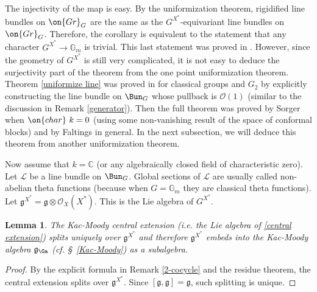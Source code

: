 \documentclass[]{pcmi}
\theoremstyle{plain}
\newtheorem{lem}[equation]{Lemma}
\theoremstyle{remark}
\theoremstyle{definition}
\newcommand{\frakg}{{\mathfrak g}}
\newcommand{\bC}{{\mathbb C}}
\newcommand{\bG}{{\mathbb G}}
\newcommand{\mL}{{\mathcal L}}
\newcommand{\mO}{{\mathcal O}}
\newcommand{\cha}{{\on{char}}}
\newcommand{\Gr}{{\on{Gr}}}
\begin{document}
The injectivity of the map is easy. By the uniformization theorem, rigidified line bundles on $\Gr_G$ are the same as the $G^{X^*}$-equivariant line bundles on $\Gr_G$. Therefore, the corollary is equivalent to the statement that any character $G^{X^*}\to \bG_m$ is trivial. This last statement was proved in \cite[Corollary 5.2]{LS}. However, since the geometry of $G^{X^*}$ is still very complicated, it is not easy to deduce the surjectivity part of the theorem from the one point uniformization theorem. Theorem \ref{uniformize line} was proved in \cite{LS} for classical groups and $G_2$ by explicitly constructing the line bundle on $\Bun_G$ whose pullback is $\mO(1)$ (similar to the discussion in Remark \ref{generator}). Then the full theorem was proved by Sorger \cite{So0} when $\cha\ k=0$ (using some non-vanishing result of the space of conformal blocks) and by Faltings \cite[Theorem 17]{Fa} in general. 
In the next subsection, we will deduce this theorem from another uniformization theorem.


Now assume that $ k=\bC$ (or any algebraically closed field of characteristic zero). Let $\mL$ be a line bundle on $\Bun_G$. Global sections of $\mL$ are usually called non-abelian theta functions (because when $G=\bG_m$ they are classical theta functions). Let $\frakg^{X^*}=\frakg\otimes\mO_X(X^*)$.  This is the Lie algebra of $G^{X^*}$.
\begin{lem}
The Kac-Moody central extension (i.e. the Lie algebra of \eqref{central extension}) splits uniquely over $\frakg^{X^*}$ and therefore $\frakg^{X^*}$ embeds into the Kac-Moody algebra $\frakg_\Ga$ (cf. \S~\ref{Kac-Moody}) as a subalgebra.
\end{lem}
\begin{proof} By the explicit formula in Remark \ref{2-cocycle} and the residue theorem, the central extension splits over $\frakg^{X^*}$. Since $[\frakg,\frakg]=\frakg$, such splitting is unique.
\end{proof}
\end{document}
